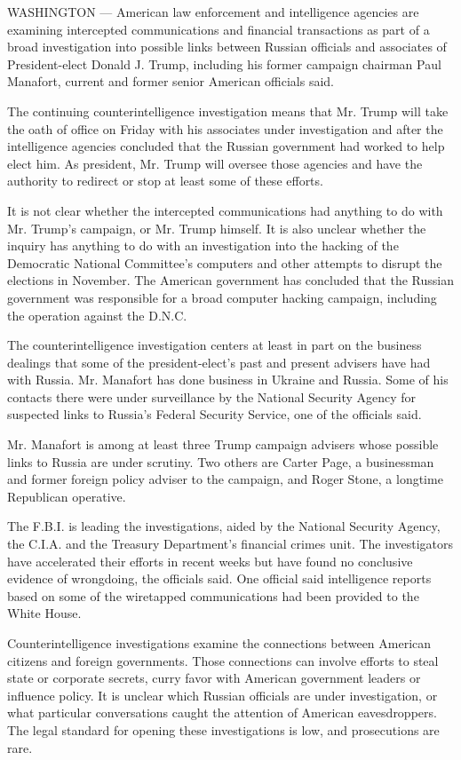 WASHINGTON --- American law enforcement and intelligence agencies are
examining intercepted communications and financial transactions as part
of a broad investigation into possible links between Russian officials
and associates of President-elect Donald J. Trump, including his former
campaign chairman Paul Manafort, current and former senior American
officials said.

The continuing counterintelligence investigation means that Mr. Trump
will take the oath of office on Friday with his associates under
investigation and after the intelligence agencies concluded that the
Russian government had worked to help elect him. As president, Mr. Trump
will oversee those agencies and have the authority to redirect or stop
at least some of these efforts.

It is not clear whether the intercepted communications had anything to
do with Mr. Trump's campaign, or Mr. Trump himself. It is also unclear
whether the inquiry has anything to do with an investigation into the
hacking of the Democratic National Committee's computers and other
attempts to disrupt the elections in November. The American government
has concluded that the Russian government was responsible for a broad
computer hacking campaign, including the operation against the D.N.C.

The counterintelligence investigation centers at least in part on the
business dealings that some of the president-elect's past and present
advisers have had with Russia. Mr. Manafort has done business in Ukraine
and Russia. Some of his contacts there were under surveillance by the
National Security Agency for suspected links to Russia's Federal
Security Service, one of the officials said.

Mr. Manafort is among at least three Trump campaign advisers whose
possible links to Russia are under scrutiny. Two others are Carter Page,
a businessman and former foreign policy adviser to the campaign, and
Roger Stone, a longtime Republican operative.

The F.B.I. is leading the investigations, aided by the National Security
Agency, the C.I.A. and the Treasury Department's financial crimes unit.
The investigators have accelerated their efforts in recent weeks but
have found no conclusive evidence of wrongdoing, the officials said. One
official said intelligence reports based on some of the wiretapped
communications had been provided to the White House.

Counterintelligence investigations examine the connections between
American citizens and foreign governments. Those connections can involve
efforts to steal state or corporate secrets, curry favor with American
government leaders or influence policy. It is unclear which Russian
officials are under investigation, or what particular conversations
caught the attention of American eavesdroppers. The legal standard for
opening these investigations is low, and prosecutions are rare.

